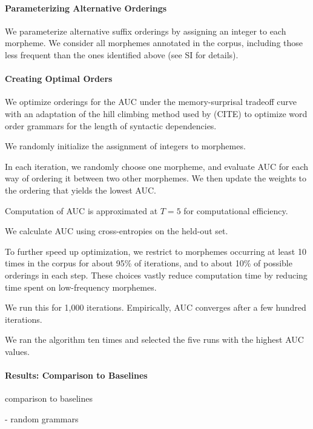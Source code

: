 \paragraph{Parameterizing Alternative Orderings}

We parameterize alternative suffix orderings by assigning an integer to each morpheme.
We consider all morphemes annotated in the corpus, including those less frequent than the ones identified above (see SI for details).

\paragraph{Creating Optimal Orders}

We optimize orderings for the AUC under the memory-surprisal tradeoff curve with an adaptation of the hill climbing method used by (CITE) to optimize word order grammars for the length of syntactic dependencies.

We randomly initialize the assignment of integers to morphemes.

In each iteration, we randomly choose one morpheme, and evaluate AUC for each way of ordering it between two other morphemes.
We then update the weights to the ordering that yields the lowest AUC.

Computation of AUC is approximated at $T=5$ for computational efficiency.

We calculate AUC using cross-entropies on the held-out set.

To further speed up optimization, we restrict to morphemes occurring at least 10 times in the corpus for about 95\% of iterations, and to about 10\% of possible orderings in each step.
These choices vastly reduce computation time by reducing time spent on low-frequency morphemes.

We run this for 1,000 iterations. Empirically, AUC converges after a few hundred iterations.

We ran the algorithm ten times and selected the five runs with the highest AUC values.

\paragraph{Results: Comparison to Baselines}
comparison to baselines

- random grammars


